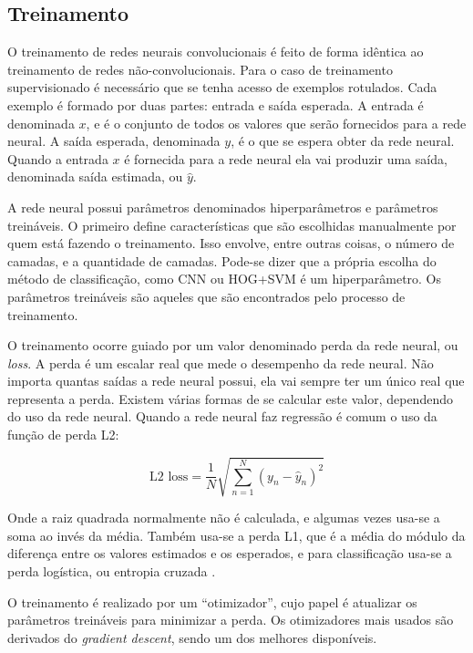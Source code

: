 \subsection{Treinamento}
O treinamento de redes neurais convolucionais é feito de forma idêntica ao
treinamento de redes não-convolucionais. Para o caso de treinamento
supervisionado é necessário que se tenha acesso de exemplos rotulados.
Cada exemplo é formado por duas partes: entrada e saída esperada.
A entrada é denominada $x$, e é o conjunto de todos os valores que serão
fornecidos para a rede neural.
A saída esperada, denominada $y$, é o que se espera obter da rede neural.
Quando a entrada $x$ é fornecida para a rede neural ela vai produzir uma saída,
denominada saída estimada, ou $\widehat{y}$.

A rede neural possui parâmetros denominados hiperparâmetros e parâmetros
treináveis. O primeiro define características que são escolhidas manualmente
por quem está fazendo o treinamento. Isso envolve, entre outras coisas, o
número de camadas, e a quantidade de camadas. Pode-se dizer que a própria
escolha do método de classificação, como CNN ou HOG+SVM é um hiperparâmetro. Os
parâmetros treináveis são aqueles que são encontrados pelo processo de
treinamento.

O treinamento ocorre guiado por um valor denominado perda da rede neural, ou
\emph{loss}. A perda é um escalar real que mede o desempenho da rede neural.
Não importa quantas saídas a rede neural possui, ela vai sempre ter um único
real que representa a perda. Existem várias formas de se calcular este valor,
dependendo do uso da rede neural. Quando a rede neural faz regressão é comum o
uso da função de perda L2:

\begin{equation}
	\text{L2 loss}=
		\frac{1}{N} \sqrt{ \sum_{n=1}^N \left( y_n - \widehat{y}_n \right)^2 }
\end{equation}

Onde a raiz quadrada normalmente não é calculada, e algumas vezes usa-se a soma
ao invés da média. Também usa-se a perda L1, que é a média do módulo da
diferença entre os valores estimados e os esperados, e para classificação
usa-se a perda logística, ou entropia cruzada \cite{robert2014machine}.

O treinamento é realizado por um ``otimizador'', cujo papel é atualizar os
parâmetros treináveis para minimizar a perda. Os otimizadores mais usados são
derivados do \emph{gradient descent}, sendo  um dos
melhores disponíveis.

